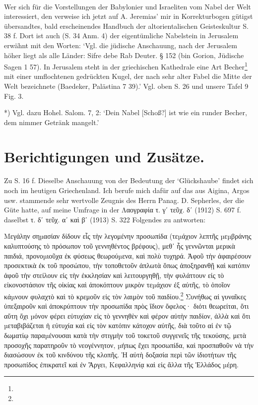 \documentclass[a4paper, 11pt, oneside]{article}
\begin{document}
\paragraph{}
Wer sich für die Vorstellungen der Babylonier und Israeliten vom Nabel der Welt interessiert, den verweise ich jetzt auf A. Jeremias' mir in Korrekturbogen gütigst übersandtes, bald erscheinendes Handbuch der altorientalischen Geisteskultur S. 38 f. Dort ist auch (S. 34 Anm. 4) der eigentümliche Nabelstein in Jerusalem erwähnt mit den Worten: `Vgl. die jüdische Anschauung, nach der Jerusalem höher liegt als alle Länder: Sifre debe Rab Deuter. § 152 (bin Gorion, Jüdische Sagen 1 57). In Jerusalem steht in der griechischen Kathedrale eine Art Becher\footnote{} mit einer umflochtenen gedrückten Kugel, der nach sehr alter Fabel die Mitte der Welt bezeichnete (Baedeker, Palästina 7 39).' Vgl. oben S. 26 und unsere Tafel 9 Fig. 3.

*) Vgl. dazu Hohel. Salom. 7, 2: `Dein Nabel [Schoß?] ist wie ein runder Becher, dem nimmer Getränk mangelt.'
\clearpage
\section{Berichtigungen und Zusätze.}
\paragraph{}
Zu S. 16 f. Dieselbe Anschauung von der Bedeutung der `Glückshaube' findet sich noch im heutigen Griechenland. Ich berufe mich dafür auf das aus Aigina, Argos usw. stammende sehr wertvolle Zeugnis des Herrn Panag. D. Sepherles, der die Güte hatte, auf meine Umfrage in der Λαογραφία τ. γʹ τεῦχ. δʹ (1912) S. 697 f. daselbst τ. δʹ τεῦχ. αʹ καὶ βʹ (1913) S. 322 Folgendes zu antworten:

Μεγάλην σηµασίαν δίδουν εἷς τὴν λεγομένην προσωπίδα (τεµάχιον λεπτῆς µεµβράνης καλυπτούσης τὸ πρόσωπον τοῦ γεννηθέντος βρέφους), μεθ᾽ ἧς γεννῶνται μερικὰ παιδιά, προνοµιοῦχα ἐκ φύσεως θεωρούµενα, καὶ πολὺ τυχηρά. Ἀφοῦ τὴν ἀφαιρέσουν προσεκτικὰ ἐκ τοῦ προσώπου, τὴν τοποθετοῦν ἀπλωτὰ ὅπως ἀποξηρανθῇ καὶ κατόπιν ἀφοῦ τὴν στείλουν εἰς τὴν ἐκκλησίαν καὶ λειτουργηθῇ, τὴν φυλάττουν εἰς τὸ εἰκονοστάσιον τῆς οἰκίας καὶ ἀποκόπτουν μικρὸν τεµάχιον ἐξ αὐτῆς, τὸ ὁποῖον κάµνουν φυλαχτὸ καὶ τὸ κρεμοῦν εἰς τὸν λαιμὸν τοῦ παιδίου.\footnote{} Συνήθως αἱ γυναῖκες ὑπεξαιροῦν καὶ ἀποκρύπτουν τὴν προσωπίδα πρὸς ἴδιον ὄφελος· διότι θεωρείται, ὅτι αὕτη ὄχι µόνον φέρει εὐτυχίαν εἰς τὸ γεννηθὲν καὶ φέρον αὐτὴν παιδίον, ἀλλὰ καὶ ὅτι µεταβιβάζεται ἡ εὐτυχία καὶ εἰς τὸν κατόπιν κάτοχον αὐτῆς, διὰ τοῦτο αἱ ἐν τῷ δωματίῳ παραµένουσαι κατὰ τὴν στιγμὴν τοῦ τοκετοῦ συγγενεῖς τῆς τεκούσης, μετὰ προσοχῆς παρατηροῦν τὸ νεογέννητον, µήπως ἔχει προσωπίδα, καὶ προσπαθοῦν νὰ τὴν διασώσουν ἐκ τοῦ κινδύνου τῆς κλοπῆς. Ἡ αὐτὴ δοξασία περὶ τῶν ἰδιοτήτων τῆς προσωπίδος ἐπικρατεῖ καὶ ἐν Ἄργει, Κεφαλληνίᾳ καὶ εἰς ἄλλα τῆς Ἑλλάδος µέρη.
\end{document}
